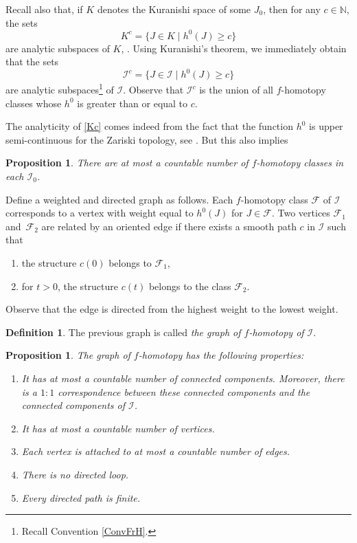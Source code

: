 \documentclass[JEP,XML,SOM,Unicode]{cedram}
\let\mathcal\mathscr
\theoremstyle{plain}
\newtheorem{proposition}[theorem]{Proposition}
\theoremstyle{definition}
\newtheorem{definition}[theorem]{Definition}
\theoremstyle{remark}
\numberwithin{equation}{section}
\newcommand{\cI}{\mathcal{I}}
\begin{document}
Recall also that, if $K$ denotes the Kuranishi space of some $J_0$, then for any $c\in\mathbb N$, the sets
\begin{equation}
\label{Kc}
K^c=\{J\in K\mid h^0(J)\geq c\}
\end{equation}
are analytic subspaces of $K$, \cf \cite{Gr}. Using Kuranishi's theorem, we immediately obtain that the sets
\begin{equation}
\label{Ic}
\cI^c=\{J\in \cI\mid h^0(J)\geq c\}
\end{equation}
are analytic subspaces\footnote{Recall Convention \ref{ConvFrH}.} of $\cI$. Observe that $\cI^c$ is the union of all $f$-homotopy classes whose $h^0$ is greater than or equal to $c$.

The analyticity of \eqref{Kc} comes indeed from the fact that the function $h^0$ is upper semi-continuous for the Zariski topology, see \cite{Gr}. But this also implies
\begin{proposition}
\label{countable2}
There are at most a countable number of $f$-homotopy classes in each $\cI_0$.
\end{proposition}

Define a weighted and directed graph as follows. Each $f$-homotopy class $\mathcal F$ of $\cI$ corresponds to a vertex with weight equal to $h^0(J)$ for $J\in\mathcal F$. Two vertices $\mathcal F_1$ and~$\mathcal F_2$ are related by an oriented edge if there exists a smooth path $c$ in $\cI$ such that
\begin{enumerate}
\item
the structure $c(0)$ belongs to $\mathcal F_1$,
\item
for $t>0$, the structure $c(t)$ belongs to the class $\mathcal F_2$.
\end{enumerate}
Observe that the edge is directed from the highest weight to the lowest weight.

\begin{definition}
\label{graph}
The previous graph is called \emph{the graph of $f$-homotopy of $\cI$}.
\end{definition}

\begin{proposition}
\label{graphproperties}
The graph of $f$-homotopy has the following properties:
\begin{enumerate}
\item\label{graphproperties1}
It has at most a countable number of connected components. Moreover, there is a $1:1$ correspondence between these connected components and the connected components of $\cI$.
\item\label{graphproperties2}
It has at most a countable number of vertices.
\item\label{graphproperties3}
Each vertex is attached to at most a countable number of edges.
\item\label{graphproperties4}
There is no directed loop.
\item\label{graphproperties5}
Every directed path is finite.
\end{enumerate}
\end{proposition}
\end{document}
